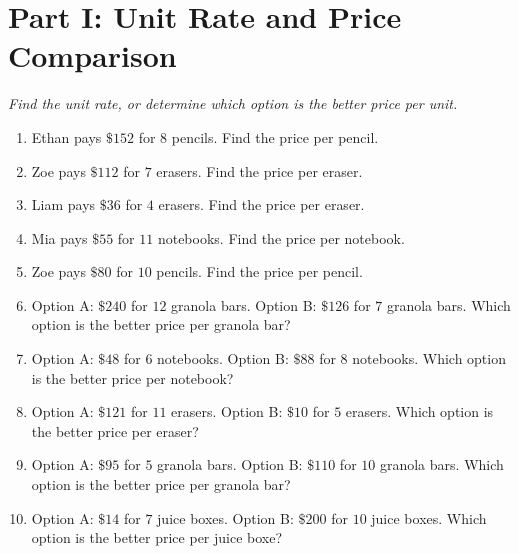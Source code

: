\documentclass[11pt]{article}
\begin{document}
\section*{Part I: Unit Rate and Price Comparison}
\noindent\textit{Find the unit rate, or determine which option is the better price per unit.}
\begin{enumerate}
  \item Ethan pays $\$152$ for $8$ pencils. Find the price per pencil.
  \vspace{2.0cm}
  \item Zoe pays $\$112$ for $7$ erasers. Find the price per eraser.
  \vspace{2.0cm}
  \item Liam pays $\$36$ for $4$ erasers. Find the price per eraser.
  \vspace{2.0cm}
  \item Mia pays $\$55$ for $11$ notebooks. Find the price per notebook.
  \vspace{2.0cm}
  \item Zoe pays $\$80$ for $10$ pencils. Find the price per pencil.
  \vspace{2.0cm}
  \item Option A: $\$240$ for $12$ granola bars. Option B: $\$126$ for $7$ granola bars. Which option is the better price per granola bar?
  \vspace{2.0cm}
  \item Option A: $\$48$ for $6$ notebooks. Option B: $\$88$ for $8$ notebooks. Which option is the better price per notebook?
  \vspace{2.0cm}
  \item Option A: $\$121$ for $11$ erasers. Option B: $\$10$ for $5$ erasers. Which option is the better price per eraser?
  \vspace{2.0cm}
  \item Option A: $\$95$ for $5$ granola bars. Option B: $\$110$ for $10$ granola bars. Which option is the better price per granola bar?
  \vspace{2.0cm}
  \item Option A: $\$14$ for $7$ juice boxes. Option B: $\$200$ for $10$ juice boxes. Which option is the better price per juice boxe?
  \vspace{2.0cm}
\end{enumerate}
\end{document}
